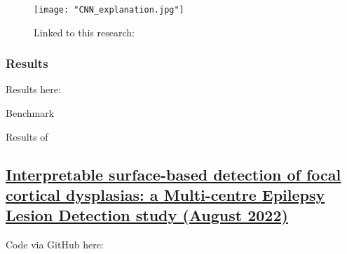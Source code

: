 \begin{figure}[htbp]
	\centering
	\texttt{[image: "CNN\_explanation.jpg"]}
	\caption{Linked to this research: }%
	\label{fig:res1}
\end{figure}

\subsubsection{Results}

Results here: 

\begin{table}[htbp]
	\centering
	\caption{Benchmark}

	\caption{Results of }%

	\caption{Best model parameter values}
	\label{tab:res1}
\end{table}

\subsection{\href{https://academic.oup.com/brain/article/145/11/3859/6659752?login=true}{Interpretable surface-based detection of focal cortical dysplasias: a Multi-centre Epilepsy Lesion Detection study (August 2022)}}
\label{sub:sec:res2}

Code via GitHub here: 

